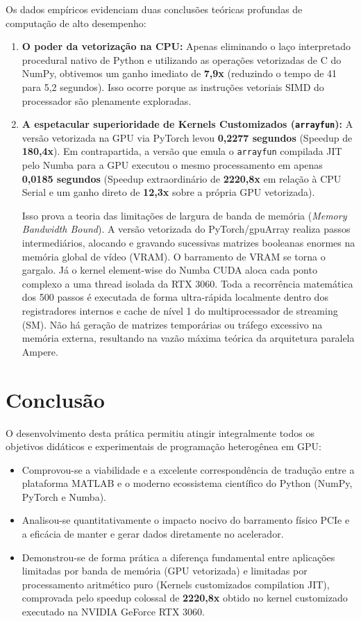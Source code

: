 \documentclass[12pt,a4paper]{article}
\begin{document}
Os dados empíricos evidenciam duas conclusões teóricas profundas de computação de alto desempenho:
\begin{enumerate}
    \item \textbf{O poder da vetorização na CPU:} Apenas eliminando o laço interpretado procedural nativo de Python e utilizando as operações vetorizadas de C do NumPy, obtivemos um ganho imediato de \textbf{7,9x} (reduzindo o tempo de 41 para 5,2 segundos). Isso ocorre porque as instruções vetoriais SIMD do processador são plenamente exploradas.
    \item \textbf{A espetacular superioridade de Kernels Customizados (\texttt{arrayfun}):} A versão vetorizada na GPU via PyTorch levou \textbf{0,2277 segundos} (Speedup de \textbf{180,4x}). Em contrapartida, a versão que emula o \texttt{arrayfun} compilada JIT pelo Numba para a GPU executou o mesmo processamento em apenas \textbf{0,0185 segundos} (Speedup extraordinário de \textbf{2220,8x} em relação à CPU Serial e um ganho direto de \textbf{12,3x} sobre a própria GPU vetorizada).
    
    Isso prova a teoria das limitações de largura de banda de memória (\textit{Memory Bandwidth Bound}). A versão vetorizada do PyTorch/gpuArray realiza passos intermediários, alocando e gravando sucessivas matrizes booleanas enormes na memória global de vídeo (VRAM). O barramento de VRAM se torna o gargalo. Já o kernel element-wise do Numba CUDA aloca cada ponto complexo a uma thread isolada da RTX 3060. Toda a recorrência matemática dos 500 passos é executada de forma ultra-rápida localmente dentro dos registradores internos e cache de nível 1 do multiprocessador de streaming (SM). Não há geração de matrizes temporárias ou tráfego excessivo na memória externa, resultando na vazão máxima teórica da arquitetura paralela Ampere.
\end{enumerate}

\section{Conclusão}

O desenvolvimento desta prática permitiu atingir integralmente todos os objetivos didáticos e experimentais de programação heterogênea em GPU:
\begin{itemize}
    \item Comprovou-se a viabilidade e a excelente correspondência de tradução entre a plataforma MATLAB e o moderno ecossistema científico do Python (NumPy, PyTorch e Numba).
    \item Analisou-se quantitativamente o impacto nocivo do barramento físico PCIe e a eficácia de manter e gerar dados diretamente no acelerador.
    \item Demonstrou-se de forma prática a diferença fundamental entre aplicações limitadas por banda de memória (GPU vetorizada) e limitadas por processamento aritmético puro (Kernels customizados compilation JIT), comprovada pelo speedup colossal de \textbf{2220,8x} obtido no kernel customizado executado na NVIDIA GeForce RTX 3060.
\end{itemize}
\end{document}
